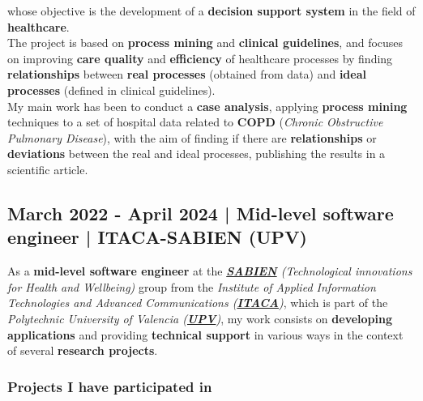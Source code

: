 \documentclass[letterpaper, 12pt, dvipsnames]{article}
\newcommand{\upvName}{Polytechnic University of Valencia}
\newcommand{\upv}{UPV}
\newcommand{\upvUrl}{https://www.upv.es/en}
\newcommand{\itacaSabien}{ITACA-SABIEN}
\newcommand{\sabienUrl}{http://www.sabien.upv.es/en/}
\begin{document}
whose objective is the development of a \textbf{decision support system} in the field of \textbf{healthcare}.\\

The project is based on \textbf{process mining} and \textbf{clinical guidelines}, and focuses on improving \textbf{care quality} and \textbf{efficiency} of healthcare processes by finding \textbf{relationships} between \textbf{real processes} (obtained from data) and \textbf{ideal processes} (defined in clinical guidelines).\\

My main work has been to conduct a \textbf{case analysis}, applying \textbf{process mining} techniques to a set of hospital data related to \textbf{COPD} (\emph{Chronic Obstructive Pulmonary Disease}), with the aim of finding if there are \textbf{relationships} or \textbf{deviations} between the real and ideal processes, publishing the results in a scientific article.

\subsection*{March 2022 - April 2024 | Mid-level software engineer | {\itacaSabien} (\upv)}

As a \textbf{mid-level software engineer} at the \emph{\textbf{\href{\sabienUrl}{SABIEN}} (Technological innovations for Health and Wellbeing)} group from the \emph{Institute of Applied Information Technologies and Advanced Communications (\textbf{\href{http://www.itaca.upv.es/}{ITACA}})}, which is part of the \emph{{\upvName} (\textbf{\href{\upvUrl}{\upv}})}, my work consists on \textbf{developing applications} and providing \textbf{technical support} in various ways in the context of several \textbf{research projects}.

\subsubsection*{Projects I have participated in}

\vspace{1em}
\end{document}
